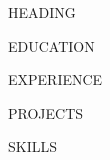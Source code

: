 \documentclass[letterpaper,11pt]{article}
\begin{document}
{{HEADING}}

{{EDUCATION}}

{{EXPERIENCE}}

{{PROJECTS}}

{{SKILLS}}

\end{document}
